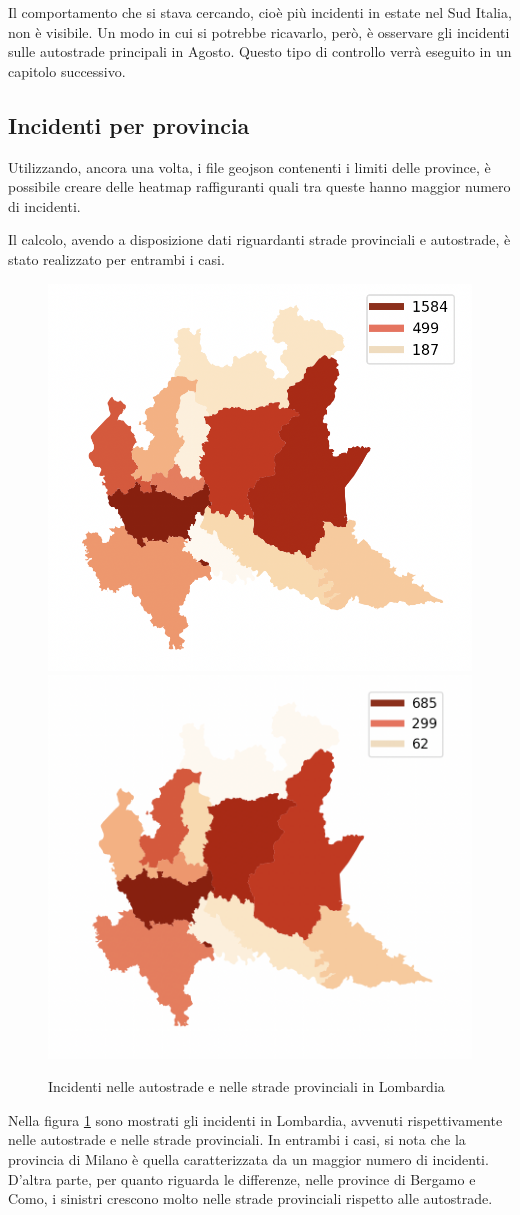 \documentclass[a4paper,12pt]{report}
\begin{document}
Il comportamento che si stava cercando, cioè più incidenti in estate nel 
Sud Italia, non è visibile. 
Un modo in cui si potrebbe ricavarlo, però, è osservare gli incidenti sulle autostrade 
principali in Agosto.
Questo tipo di controllo verrà eseguito in un capitolo successivo.


\subsection{Incidenti per provincia}

Utilizzando, ancora una volta, i file geojson contenenti i limiti delle province, è 
possibile creare delle heatmap raffiguranti quali tra queste hanno maggior numero 
di incidenti.

Il calcolo, avendo a disposizione dati riguardanti strade provinciali e autostrade, 
è stato realizzato per entrambi i casi.

\begin{figure}
    \includegraphics[width=0.5\linewidth]{../src/provincia/lombardia_autostrade.png}
    \includegraphics[width=0.5\linewidth]{../src/provincia/lombardia_strade_prov.png}
    \caption{Incidenti nelle autostrade e nelle strade provinciali in Lombardia}
    \label{fig:lombardia-strade}
\end{figure}

Nella figura \ref{fig:lombardia-strade} sono mostrati gli incidenti in Lombardia, 
avvenuti rispettivamente nelle autostrade e nelle strade provinciali.
In entrambi i casi, si nota che la provincia di Milano è quella caratterizzata da 
un maggior numero di incidenti. 
D'altra parte, per quanto riguarda le differenze, nelle province di Bergamo e Como, 
i sinistri crescono molto nelle strade provinciali rispetto alle autostrade.
\end{document}

